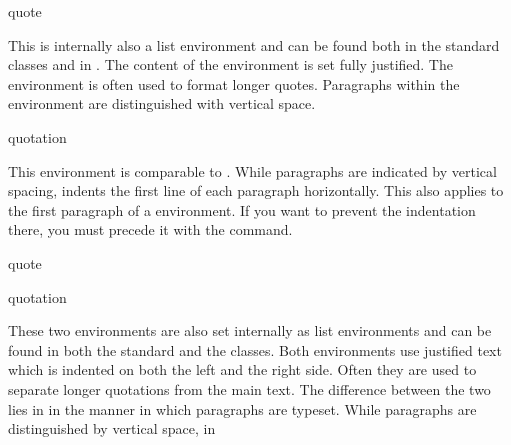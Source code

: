   \iftrue%
    \begin{Declaration}
  	  \begin{Environment}{quote}\end{Environment}
  	\end{Declaration}%
  	This is
  	internally also a list environment and can be found both in the standard classes and in
  	{\KOMAScript}. The content of the environment is set fully justified.
    The environment is often used to format longer quotes.
    Paragraphs within the environment are distinguished with vertical space.%
    \EndIndexGroup
  
    \begin{Declaration}
      \begin{Environment}{quotation}\end{Environment}
    \end{Declaration}%
    This
    environment is comparable to
    . While
     paragraphs are indicated by
    vertical spacing,  indents the first line of each
    paragraph horizontally. This also applies to the first paragraph of a
     environment. If you want to prevent the
    indentation there, you must precede it with the
     command.%
  \else
    \begin{Declaration}
      \begin{Environment}{quote}\end{Environment}
      \begin{Environment}{quotation}\end{Environment}
    \end{Declaration}%
     These two
    environments are also set internally as list
    environments and can be found in both the standard and the {\KOMAScript}
    classes. Both environments use justified text which is indented on both
    the left and the right side. Often they are used to separate longer
    quotations from the main text. The difference between
    the two lies in in the manner in which paragraphs are typeset. While
     paragraphs are distinguished by vertical space, in
